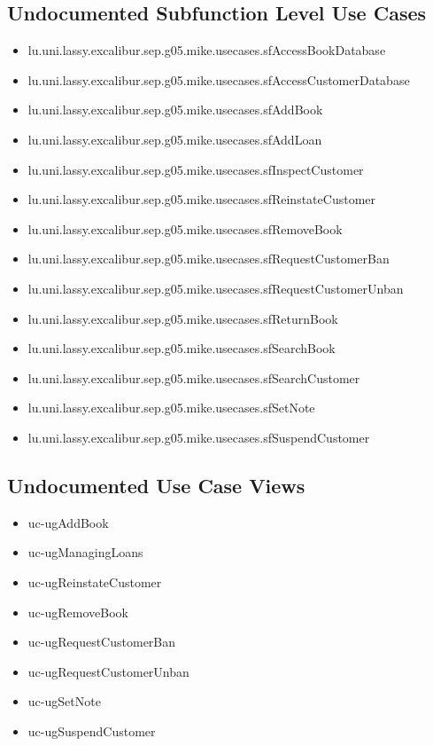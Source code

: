 \subsection[Undocumented Use Cases - Subfunction Level]{Undocumented Subfunction Level Use Cases}
\begin{itemize}
\item lu.uni.lassy.excalibur.sep.g05.mike.usecases.sfAccessBookDatabase 
\item lu.uni.lassy.excalibur.sep.g05.mike.usecases.sfAccessCustomerDatabase 
\item lu.uni.lassy.excalibur.sep.g05.mike.usecases.sfAddBook 
\item lu.uni.lassy.excalibur.sep.g05.mike.usecases.sfAddLoan 
\item lu.uni.lassy.excalibur.sep.g05.mike.usecases.sfInspectCustomer 
\item lu.uni.lassy.excalibur.sep.g05.mike.usecases.sfReinstateCustomer 
\item lu.uni.lassy.excalibur.sep.g05.mike.usecases.sfRemoveBook 
\item lu.uni.lassy.excalibur.sep.g05.mike.usecases.sfRequestCustomerBan 
\item lu.uni.lassy.excalibur.sep.g05.mike.usecases.sfRequestCustomerUnban 
\item lu.uni.lassy.excalibur.sep.g05.mike.usecases.sfReturnBook 
\item lu.uni.lassy.excalibur.sep.g05.mike.usecases.sfSearchBook 
\item lu.uni.lassy.excalibur.sep.g05.mike.usecases.sfSearchCustomer 
\item lu.uni.lassy.excalibur.sep.g05.mike.usecases.sfSetNote 
\item lu.uni.lassy.excalibur.sep.g05.mike.usecases.sfSuspendCustomer 
\end{itemize}

\subsection[Undocumented Use Case Views]{Undocumented Use Case Views}
\begin{itemize}
\item uc-ugAddBook 
\item uc-ugManagingLoans 
\item uc-ugReinstateCustomer 
\item uc-ugRemoveBook 
\item uc-ugRequestCustomerBan 
\item uc-ugRequestCustomerUnban 
\item uc-ugSetNote 
\item uc-ugSuspendCustomer 
\end{itemize}




